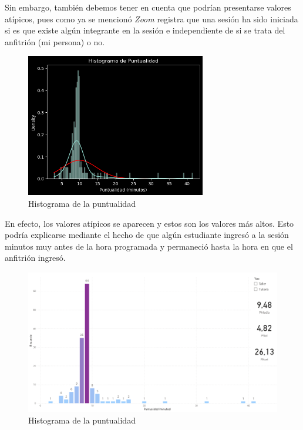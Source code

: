 \documentclass[11pt,a4paper]{book}
\theoremstyle{definition}%
\begin{document}
                Sin embargo, también debemos tener en cuenta que podrían presentarse valores atípicos, pues como ya se mencionó \textit{Zoom} registra que una sesión ha sido iniciada si es que existe algún integrante en la sesión e independiente de si se trata del anfitrión (mi persona) o no.
                \begin{figure}[H]
                    \centering
                    \includegraphics[width=0.7\textwidth]{Sources/histogram_Puntualidad.png}
                    \caption{Histograma de la puntualidad}
                \end{figure}
                En efecto, los valores atípicos se aparecen y estos son los valores más altos. Esto podría explicarse mediante el hecho de que algún estudiante ingresó a la sesión minutos muy antes de la hora programada y permaneció hasta la hora en que el anfitrión ingresó.
                \begin{figure}[H]
                    \centering
                    \includegraphics[width=1\textwidth]{Sources/histograma_PuntualidadGlobal.png}
                    \caption{Histograma de la puntualidad}
                \end{figure}
\end{document}
